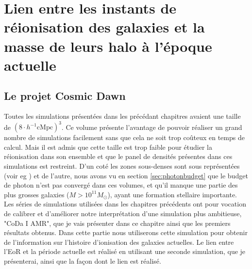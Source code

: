 \chapter{Lien entre les instants de réionisation des galaxies et la masse de leurs halo à l'époque actuelle}
\label{sec:z0}

\section{Le projet Cosmic Dawn}
\label{sec:CODAEMMA}

Toutes les simulations présentées dans les précédant chapitres avaient une taille de $\left( 8\cdot h^{-1} \mathrm{cMpc} \right)^3$.
Ce volume présente l'avantage de pouvoir réaliser un grand nombre de simulations facilement sans que cela ne soit trop coûteux en temps de calcul.
Mais il est admis que cette taille est trop faible pour étudier la réionisation dans son ensemble et que le panel de densités présentes dans ces simulations est restreint.
D'un coté les zones sous-denses sont sous représentées  (voir eg \cite{iliev_simulating_2006}) et de l'autre, nous avons vu en section \ref{sec:photonbudget} que le budget de photon n'est pas convergé dans ces volumes, et qu'il manque une partie des plus grosses galaxies ($M>10^{11}M_\odot$), ayant une formation stellaire importante.
Les séries de simulations utilisées dans les chapitres précédents ont pour vocation de calibrer et d'améliorer notre interprétation d'une simulation plus ambitieuse, "CoDa I AMR", que je vais présenter dans ce chapitre ainsi que les premiers résultats obtenus.
Dans cette partie nous utiliserons cette simulation pour obtenir de l'information sur l'histoire d'ionisation des galaxies actuelles.
Le lien entre l'\ac{EoR} et la période actuelle est réalisé en utilisant une seconde simulation, que je présenterai, ainsi que la façon dont le lien est réalisé.



